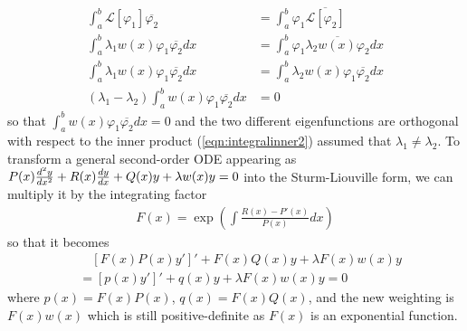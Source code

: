 \begin{align*}
\int_a^b \mathcal{L}[\varphi_1]\overline{\varphi_2} &= \int_a^b \varphi_1\overline{\mathcal{L}[\varphi_2]} \\
\int_a^b \lambda_1 w(x)\varphi_1\overline{\varphi_2} dx &= \int_a^b \varphi_1\overline{\lambda_2 w(x)\varphi_2} dx \\
\int_a^b \lambda_1 w(x)\varphi_1\overline{\varphi_2} dx &= \int_a^b \lambda_2 w(x)\varphi_1 \overline{\varphi_2} dx\\
(\lambda_1 - \lambda_2) \int_a^b w(x)\varphi_1 \overline{\varphi_2} dx &= 0
\end{align*}
so that $\int_a^b w(x)\varphi_1 \overline{\varphi_2} dx = 0$ and the two different eigenfunctions are orthogonal with respect to the inner product (\ref{eqn:integralinner2}) assumed that $\lambda_1 \neq \lambda_2$. To transform a general second-order ODE appearing as $\smash{P(x)\frac{d^2y}{dx^2} + R(x)\frac{dy}{dx}} + Q(x)y + \lambda w(x)y \allowbreak = 0$ into the Sturm-Liouville form, we can multiply it by the integrating factor 
\begin{align}
F(x) = \exp(\int \frac{R(x) - P'(x)}{P(x)} dx) \label{eqn:intfactorsl}
\end{align}
so that it becomes
\begin{align}
&\quad [F(x)P(x)y']' + F(x)Q(x)y + \lambda F(x)w(x)y \nonumber \\
&= [p(x)y']' + q(x)y + \lambda F(x)w(x)y = 0
\end{align}
\footnotemark{} where $p(x) = F(x)P(x)$, $q(x) = F(x)Q(x)$, and the new weighting is $F(x)w(x)$ which is still positive-definite as $F(x)$ is an exponential function.

